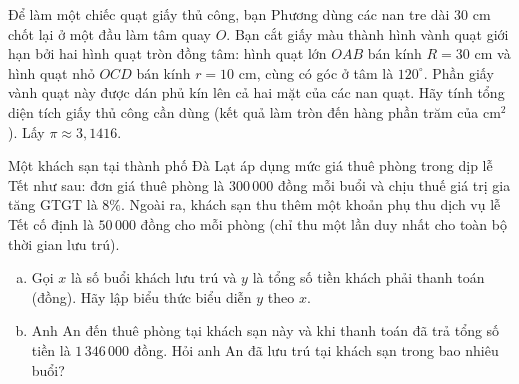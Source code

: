 \begin{bt}%
Để làm một chiếc quạt giấy thủ công, bạn Phương dùng các nan tre dài $30\text{ cm}$ chốt lại ở một đầu làm tâm quay $O$. Bạn cắt giấy màu thành hình vành quạt giới hạn bởi hai hình quạt tròn đồng tâm: hình quạt lớn $OAB$ bán kính $R = 30\text{ cm}$ và hình quạt nhỏ $OCD$ bán kính $r = 10\text{ cm}$, cùng có góc ở tâm là $120^\circ$. Phần giấy vành quạt này được dán phủ kín lên cả hai mặt của các nan quạt. Hãy tính tổng diện tích giấy thủ công cần dùng (kết quả làm tròn đến hàng phần trăm của $\text{cm}^2$). Lấy $\pi \approx 3{,}1416$.
\end{bt}

\begin{bt}%
Một khách sạn tại thành phố Đà Lạt áp dụng mức giá thuê phòng trong dịp lễ Tết như sau: đơn giá thuê phòng là $300\,000$ đồng mỗi buổi và chịu thuế giá trị gia tăng GTGT là $8\%$. Ngoài ra, khách sạn thu thêm một khoản phụ thu dịch vụ lễ Tết cố định là $50\,000$ đồng cho mỗi phòng (chỉ thu một lần duy nhất cho toàn bộ thời gian lưu trú).
\begin{enumerate}[a)]
    \item Gọi $x$ là số buổi khách lưu trú và $y$ là tổng số tiền khách phải thanh toán (đồng). Hãy lập biểu thức biểu diễn $y$ theo $x$.
    \item Anh An đến thuê phòng tại khách sạn này và khi thanh toán đã trả tổng số tiền là $1\,346\,000$ đồng. Hỏi anh An đã lưu trú tại khách sạn trong bao nhiêu buổi?
\end{enumerate}
\end{bt}

